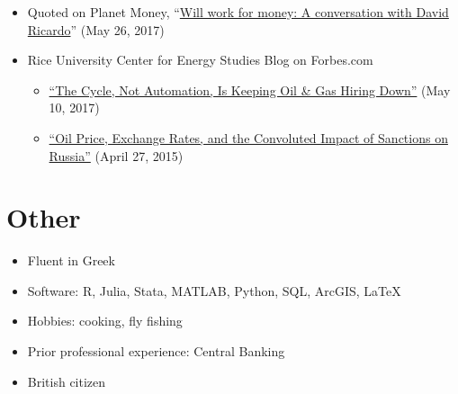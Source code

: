 \documentclass{article}[12]
\begin{document}
\begin{itemize}[itemsep=0.5em]
    \item Quoted on Planet Money, ``\href{https://www.marketplace.org/2017/05/26}{Will work for money: A conversation with David Ricardo}'' (May 26, 2017)

    \item Rice University Center for Energy Studies Blog on Forbes.com
        \begin{itemize}
            \item \href{https://www.forbes.com/sites/thebakersinstitute/2017/05/10/the-cycle-not-automation-is-keeping-oil-gas-hiring-down}{``The Cycle, Not Automation, Is Keeping Oil \& Gas Hiring Down''} (May 10, 2017)
            \item \href{https://www.forbes.com/sites/thebakersinstitute/2015/04/27/oil-price-exchange-rates-and-the-convoluted-impact-of-sanctions-on-russia}{``Oil Price, Exchange Rates, and the Convoluted Impact of Sanctions on Russia''} (April 27, 2015)
        \end{itemize}

\end{itemize}

\section{Other}

\begin{itemize}[itemsep=0.5em]
    \item Fluent in Greek
    \item Software: R, Julia, Stata, MATLAB, Python, SQL, ArcGIS, \LaTeX
    \item Hobbies: cooking, fly fishing
    \item Prior professional experience: Central Banking
    \item British citizen
\end{itemize}


\thispagestyle{laststyle}
\end{document}
